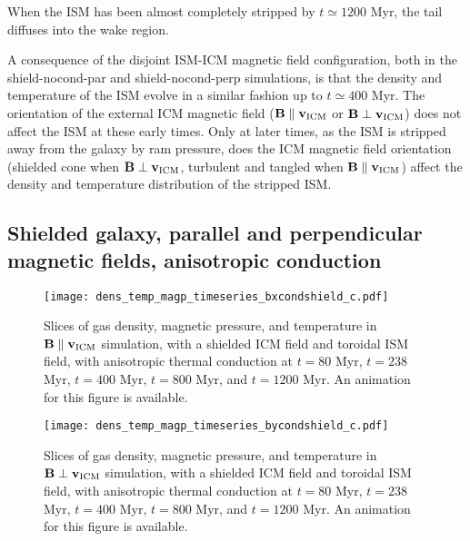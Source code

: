 \documentclass[twocolumn]{aastex6}
\begin{document}
When the ISM has been almost completely stripped by $t \simeq 1200$ Myr, the tail diffuses into the wake region.

A consequence of the disjoint ISM-ICM magnetic field configuration, both in the shield-nocond-par and shield-nocond-perp simulations, is that the density and temperature of the ISM evolve in a similar fashion up to $t \simeq 400$ Myr. The orientation of the external ICM magnetic field ($\mathbf{B} \parallel \mathbf{v_{\rm ICM}}$  or $\mathbf{B} \perp \mathbf{v_{\rm ICM}}$) does not affect the ISM at these early times. Only at later times, as the ISM is stripped away from the galaxy by ram pressure, does the ICM magnetic field orientation (shielded cone when $\mathbf{B} \perp \mathbf{v_{\rm ICM}}$, turbulent and tangled when $\mathbf{B} \parallel \mathbf{v_{\rm ICM}}$) affect the density and temperature distribution of the stripped ISM.
 
\subsection{Shielded galaxy, parallel and perpendicular magnetic fields, anisotropic conduction }
\label{sec:cond_shield}

\begin{figure*}[!htbp]
  \begin{center}
    {\texttt{[image: dens\_temp\_magp\_timeseries\_bxcondshield\_c.pdf]}}
     \caption{Slices of gas  density, magnetic pressure, and temperature in $\mathbf{B} \parallel \mathbf{v_{\rm ICM}}$ simulation, with a shielded ICM field and toroidal ISM field, with anisotropic thermal conduction at $t = 80$ Myr, $t = 238$ Myr, $t = 400$ Myr, $t = 800$ Myr, and $t = 1200$ Myr. An animation for this figure is available.\label{fig:bxcondshield}}
  \end{center}  
\end{figure*}

\begin{figure*}[!htbp]
  \begin{center}
    {\texttt{[image: dens\_temp\_magp\_timeseries\_bycondshield\_c.pdf]}}
     \caption{Slices of gas density, magnetic pressure, and temperature in $\mathbf{B} \perp \mathbf{v_{\rm ICM}}$ simulation, with a shielded ICM field and toroidal ISM field, with anisotropic thermal conduction at $t = 80$ Myr, $t = 238$ Myr, $t = 400$ Myr, $t = 800$ Myr, and $t = 1200$ Myr. An animation for this figure is available. \label{fig:bycondshield}}
  \end{center}  
\end{figure*}
 
\end{document}
